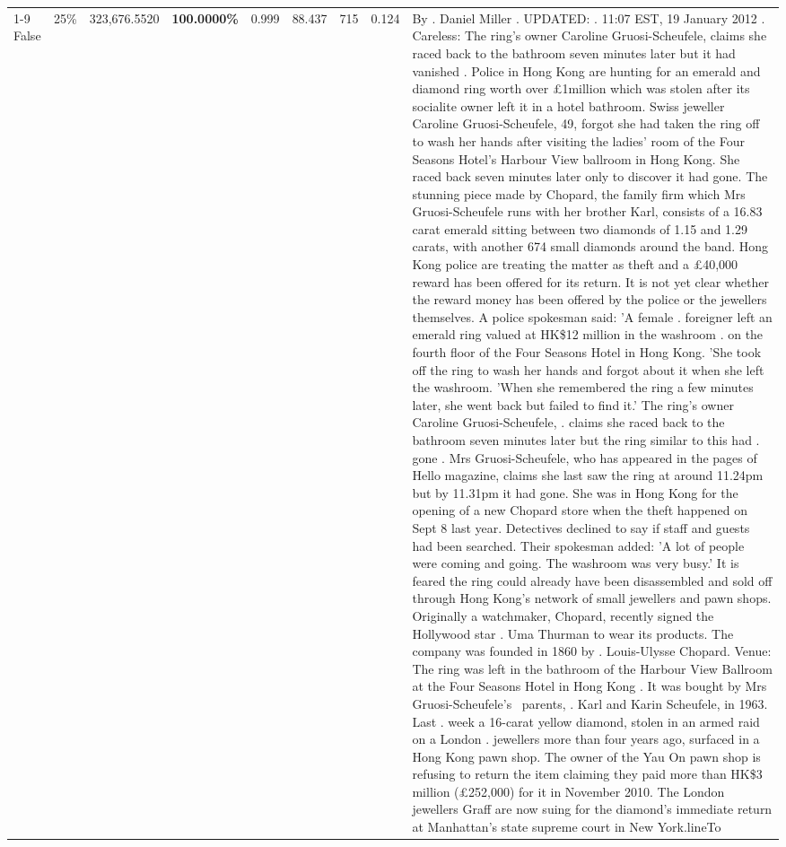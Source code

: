 \begin{table}[H]
\begin{tabular}{lllrlllll}
\cline{1-9} \cline{2-9}
False & 25\% & 323,676.5520 & \bfseries \color{red} 100.0000\% & 0.999 & 88.437 & 715 & 0.124 & By . Daniel Miller . UPDATED: . 11:07 EST, 19 January 2012 . Careless: The ring's owner Caroline Gruosi-Scheufele, claims she raced back to the bathroom seven minutes later but it had vanished . Police in Hong Kong are hunting for an emerald and diamond ring worth over £1million which was stolen after its socialite owner left it in a hotel bathroom. Swiss jeweller Caroline Gruosi-Scheufele, 49, forgot she had taken the ring off to wash her hands after visiting the ladies' room of the Four Seasons Hotel's Harbour View ballroom in Hong Kong. She raced back seven minutes later only to discover it had gone. The stunning piece made by Chopard, the family firm which Mrs Gruosi-Scheufele runs with her brother Karl, consists of a 16.83 carat emerald sitting between two diamonds of 1.15 and 1.29 carats, with another 674 small diamonds around the band. Hong Kong police are treating the matter as theft and a £40,000 reward has been offered for its return. It is not yet clear whether the reward money has been offered by the police or the jewellers themselves. A police spokesman said: 'A female . foreigner left an emerald ring valued at HK\$12 million in the washroom . on the fourth floor of the Four Seasons Hotel in Hong Kong. 'She took off the ring to wash her hands and forgot about it when she left the washroom. 'When she remembered the ring a few minutes later, she went back but failed to find it.' The ring's owner Caroline Gruosi-Scheufele, . claims she raced back to the bathroom seven minutes later but the ring similar to this had . gone . Mrs Gruosi-Scheufele, who has appeared in the pages of Hello magazine, claims she last saw the ring at around 11.24pm but by 11.31pm it had gone. She was in Hong Kong for the opening of a new Chopard store when the theft happened on Sept 8 last year. Detectives declined to say if staff and guests had been searched. Their spokesman added: 'A lot of people were coming and going. The washroom was very busy.' It is feared the ring could already have been disassembled and sold off through Hong Kong's network of small jewellers and pawn shops. Originally a watchmaker, Chopard, recently signed the Hollywood star . Uma Thurman to wear its products. The company was founded in 1860 by . Louis-Ulysse Chopard. Venue: The ring was left in the bathroom of the Harbour View Ballroom at the Four Seasons Hotel in Hong Kong . It was bought by Mrs Gruosi-Scheufele's  parents, . Karl and Karin Scheufele, in 1963. Last . week a 16-carat yellow diamond, stolen in an armed raid on a London . jewellers more than four years ago, surfaced in a Hong Kong pawn shop. The owner of the Yau On pawn shop is refusing to return the item claiming they paid more than HK\$3 million (£252,000) for it in November 2010. The London jewellers Graff are now suing for the diamond’s immediate return at Manhattan’s state supreme court in New York.lineTo \\

\end{tabular}
\end{table}
